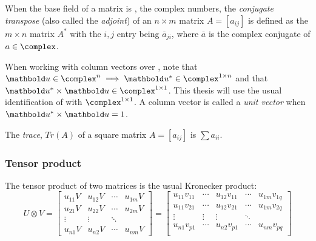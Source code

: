 When the base field of a matrix is \complex, the complex numbers, 
the \emph{conjugate transpose} (also called the \emph{adjoint})
of  an $n\times m$ matrix $A=[a_{ij}]$ is defined
as the $m\times n$ matrix
$A^{*}$ with 
the $i,j$ entry being $\overline{a}_{ji}$, 
where  $\overline{a}$ is the complex conjugate of $a\in\complex$.

When working with column vectors over \complex, note that
$\vc{u} \in \complex^n \implies \vc{u}^{*} \in 
\complex^{1\times n}$ and that
 $\vc{u}^{*}\times \vc{u} \in \complex^{1\times 1}$.
This thesis will use the usual identification of 
\complex{} with $\complex^{1\times1}$. A column
vector  is called a \emph{unit vector} 
when $\vc{u}^{*}\times \vc{u} = 1$.

\begin{definition}[Trace]
The \emph{trace}, $Tr(A)$ of a square matrix $A=[a_{ij}]$ is $\sum a_{ii}$.
\end{definition}



\subsubsection{Tensor product}
The tensor product of two matrices is the usual Kronecker product:
\[U\otimes V = 
\begin{bmatrix}
u_{11}V&u_{12}V & \cdots &u_{1m}V\\
u_{21}V&u_{22}V & \cdots &u_{2m}V \\
\vdots&\vdots&\ddots\\
u_{n1}V&u_{n2}V & \cdots &u_{nm}V 
\end{bmatrix}
=
\begin{bmatrix}
u_{11}v_{11}&\cdots&u_{12}v_{11} & \cdots& u_{1m}v_{1q} \\
u_{11}v_{21}&\cdots&u_{12}v_{21} & \cdots& u_{1m}v_{2q} \\
\vdots&\vdots&\vdots&\ddots \\
u_{n1}v_{p1}&\cdots&u_{n2}v_{p1} & \cdots& u_{nm}v_{pq} \\
\end{bmatrix}
\]

